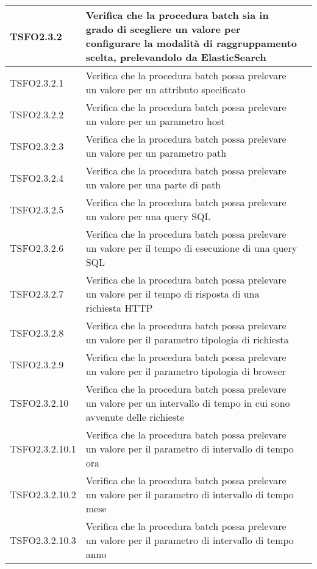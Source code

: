 \begin{center}
\begin{longtable}{ | >{\centering\arraybackslash}m{2.5cm} | >{\raggedright\arraybackslash}m{9cm} | >{\centering\arraybackslash}m{3.5cm} | }
				TSFO2.3.2 & Verifica che la procedura batch sia in grado di scegliere un valore per configurare
							la modalità di raggruppamento scelta, prelevandolo da ElasticSearch
						& \donetext{} \\ \hline
						
				TSFO2.3.2.1 & Verifica che la procedura batch possa prelevare un valore per un attributo speciﬁcato
 & \donetext{} \\ \hline
				TSFO2.3.2.2 & Verifica che la procedura batch possa prelevare un valore per un parametro host
& \donetext{} \\ \hline 
				TSFO2.3.2.3 & Verifica che la procedura batch possa prelevare un valore per un parametro path
 & \donetext{} \\ \hline
				TSFO2.3.2.4 & Verifica che la procedura batch possa prelevare un valore per una parte di path
 & \donetext{} \\ \hline
				TSFO2.3.2.5 & Verifica che la procedura batch possa prelevare un valore per una query SQL & \donetext{} \\ \hline
				TSFO2.3.2.6 & Verifica che la procedura batch possa prelevare un valore per il tempo di esecuzione di una query SQL & \donetext{} \\ \hline
				TSFO2.3.2.7 & Verifica che la procedura batch possa prelevare un valore per il tempo di risposta di una richiesta HTTP
 & \donetext{} \\ \hline
				TSFO2.3.2.8 & Verifica che la procedura batch possa prelevare un valore per il parametro tipologia di richiesta
 & \donetext{} \\ \hline
				TSFO2.3.2.9 & Verifica che la procedura batch possa prelevare un valore per il parametro tipologia di browser
 & \donetext{} \\ \hline
				TSFO2.3.2.10 & Verifica che la procedura batch possa prelevare un valore per un intervallo di tempo in cui sono avvenute delle richieste
 & \donetext{} \\ \hline
				TSFO2.3.2.10.1 & Verifica che la procedura batch possa prelevare un valore per il parametro di intervallo di tempo ora
 & \donetext{} \\ \hline
				TSFO2.3.2.10.2 & Verifica che la procedura batch possa prelevare un valore per il parametro di intervallo di tempo mese
 & \donetext{} \\ \hline
				TSFO2.3.2.10.3 & Verifica che la procedura batch possa prelevare un valore per il parametro di intervallo di tempo anno

& \donetext{} \\ \hline
				

\end{longtable}
\end{center}

